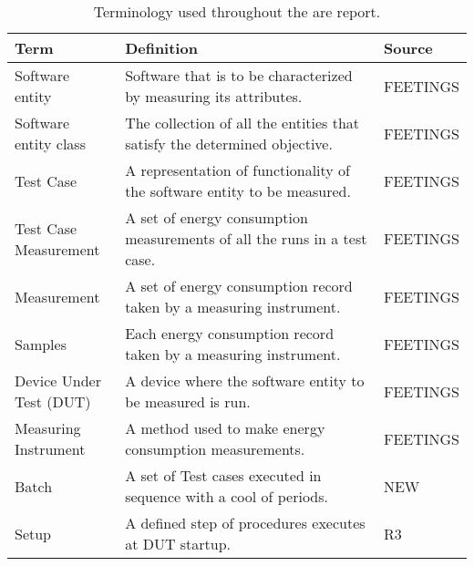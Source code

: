 
\begin{table}[]
    \begin{tabular}{| p{0.25\linewidth} | p{0.7\linewidth}| p{0.25\linewidth}|}
        \hline
        \textbf{Term}           & \textbf{Definition}                                                       & \textbf{Source} \\ \hline
        Software entity         & Software that is to be characterized by measuring its attributes.         & FEETINGS        \\ \hline
        Software entity class   & The collection of all the entities that satisfy the determined objective. & FEETINGS        \\ \hline
        Test Case               & A representation of functionality of the software entity to be measured.  & FEETINGS        \\ \hline
        Test Case Measurement    & A set of energy consumption measurements of all the runs in a test case.  & FEETINGS        \\ \hline
        Measurement             & A set of energy consumption record taken by a measuring instrument.       & FEETINGS        \\ \hline
        Samples                 & Each energy consumption record taken by a measuring instrument.           & FEETINGS        \\ \hline
        Device Under Test (DUT) & A device where the software entity to be measured is run.                 & FEETINGS        \\ \hline
        Measuring Instrument    & A method used to make energy consumption measurements.                    & FEETINGS        \\ \hline
        Batch                   & A set of Test cases executed in sequence with a cool of periods.            & NEW             \\ \hline
        Setup                   & A defined step of procedures executes at DUT startup.                     & R3              \\ \hline
        \end{tabular}
    \caption{Terminology used throughout the are report.}
    \label{tab:feetTable}
    \end{table}